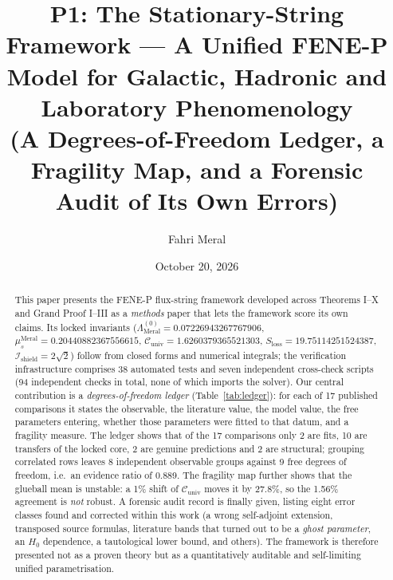 \documentclass[12pt,a4paper]{article}
\title{\textbf{P1: The Stationary-String Framework --- A Unified FENE-P Model for Galactic, Hadronic and Laboratory Phenomenology} \\[0.3cm]
\large (A Degrees-of-Freedom Ledger, a Fragility Map, and a Forensic Audit of Its Own Errors)}
\author{Fahri Meral}
\date{October 20, 2026}
\begin{document}
\maketitle

\begin{abstract}
This paper presents the FENE-P flux-string framework developed across
Theorems I--X and Grand Proof I--III as a \emph{methods} paper that lets the
framework score its own claims. Its locked invariants
($\Lambda_{\mathrm{Meral}}^{(0)} = 0.07226943267767906$,
$\mu_s^{\mathrm{Meral}} = 0.20440882367556615$,
$\mathcal{C}_{\mathrm{univ}} = 1.6260379365521303$,
$S_{\mathrm{loss}} = 19.75114251524387$,
$\mathcal{I}_{\mathrm{shield}} = 2\sqrt{2}$) follow from closed forms and
numerical integrals; the verification infrastructure comprises 38 automated
tests and seven independent cross-check scripts (94 independent checks in
total, none of which imports the solver). Our central contribution is a
\emph{degrees-of-freedom ledger} (Table~\ref{tab:ledger}): for each of 17
published comparisons it states the observable, the literature value, the
model value, the free parameters entering, whether those parameters were
fitted to that datum, and a fragility measure. The ledger shows that of the
17 comparisons only 2 are fits, 10 are transfers of the locked core, 2 are
genuine predictions and 2 are structural; grouping correlated rows leaves 8
independent observable groups against 9 free degrees of freedom, i.e.\ an
evidence ratio of 0.889. The fragility map further shows that the glueball
mean is unstable: a 1\% shift of $\mathcal{C}_{\mathrm{univ}}$ moves it by
27.8\%, so the 1.56\% agreement is \emph{not} robust. A forensic audit
record is finally given, listing eight error classes found and corrected
within this work (a wrong self-adjoint extension, transposed source
formulas, literature bands that turned out to be a \emph{ghost parameter},
an $H_0$ dependence, a tautological lower bound, and others). The framework
is therefore presented not as a proven theory but as a quantitatively
auditable and self-limiting unified parametrisation.
\end{abstract}
\end{document}
